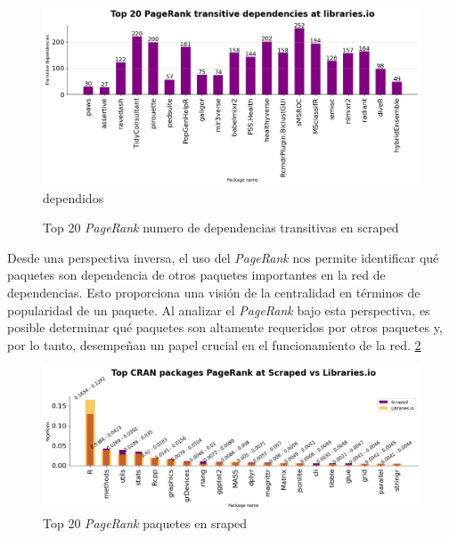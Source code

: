 \begin{figure}[h!]
    \begin{center}
        \includegraphics[width=1\textwidth]{img/cran/pr_trans2.png}dependidos
        \caption{Top 20 \textit{PageRank} numero de dependencias transitivas en scraped}
        \label{fig:Top 20 PageRank numero de dependencias transitivas en scraped}
    \end{center}
\end{figure}

Desde una perspectiva inversa, el uso del \textit{PageRank} nos permite identificar qué paquetes son dependencia
de otros paquetes importantes en la red de dependencias. Esto proporciona una visión de
la centralidad en términos de popularidad de un paquete. Al analizar el \textit{PageRank} bajo esta perspectiva, es
posible determinar qué paquetes son altamente requeridos por otros paquetes y, por lo tanto,
desempeñan un papel crucial en el funcionamiento de la red. \ref{fig:Top 20 PageRank paquetes en sraped}

\begin{figure}[h!]
    \begin{center}
        \includegraphics[width=1\textwidth]{img/cran/pr_inverted.png}
        \caption{Top 20 \textit{PageRank} paquetes en sraped}
        \label{fig:Top 20 PageRank paquetes en sraped}
    \end{center}
\end{figure}

